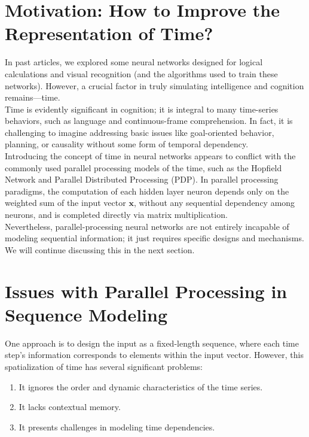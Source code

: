 \documentclass[11p,oneside]{book}
\begin{document}
\section*{Motivation: How to Improve the Representation of Time?}

In past articles, we explored some neural networks designed for logical calculations and visual recognition (and the algorithms used to train these networks). However, a crucial factor in truly simulating intelligence and cognition remains—time. \\

Time is evidently significant in cognition; it is integral to many time-series behaviors, such as language and continuous-frame comprehension. In fact, it is challenging to imagine addressing basic issues like goal-oriented behavior, planning, or causality without some form of temporal dependency. \\

Introducing the concept of time in neural networks appears to conflict with the commonly used parallel processing models of the time, such as the Hopfield Network and Parallel Distributed Processing (PDP). In parallel processing paradigms, the computation of each hidden layer neuron depends only on the weighted sum of the input vector $\mathbf{x}$, without any sequential dependency among neurons, and is completed directly via matrix multiplication. \\

Nevertheless, parallel-processing neural networks are not entirely incapable of modeling sequential information; it just requires specific designs and mechanisms. We will continue discussing this in the next section. \\

\section*{Issues with Parallel Processing in Sequence Modeling}

One approach is to design the input as a fixed-length sequence, where each time step’s information corresponds to elements within the input vector. However, this spatialization of time has several significant problems:
\begin{enumerate}
    \item It ignores the order and dynamic characteristics of the time series.
    \item It lacks contextual memory.
    \item It presents challenges in modeling time dependencies.
\end{enumerate}
\end{document}
